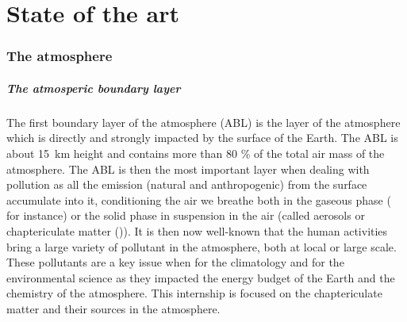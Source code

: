 \documentclass[a4paper,12pt]{memoir}
\newcommand{\PM}{\text{PM}}
\begin{document}
%
%


\part{State of the art}%
\label{cha:state_of_the_art}

\section{The atmosphere}%
\label{sec:the_atmosphere}

\subsubsection{The atmosperic boundary layer}%
\label{ssub:the_atmosperic_boundary_layer}
The first boundary layer of the atmosphere (ABL) is the layer of the atmosphere
which is directly and strongly impacted by the surface of the Earth. The ABL is
about \SI{15}{\kilo\m} height and contains more than 80 \% of the total air mass of
the atmosphere.  The ABL is then the most important layer when dealing with
pollution as all the emission (natural and anthropogenic) from the surface
accumulate into it, conditioning the air we breathe both in the gaseous phase
( for instance) or the solid phase in suspension in the air (called
aerosols or chaptericulate matter (\PM)).  It is then now well-known that the human
activities bring a large variety of pollutant in the atmosphere, both at local
or large scale.  These pollutants are a key issue when for the climatology and
for the environmental science as they impacted the energy budget of the Earth
and the chemistry of the atmosphere.  This internship is focused on the
chaptericulate matter and their sources in the atmosphere. 
\end{document}
